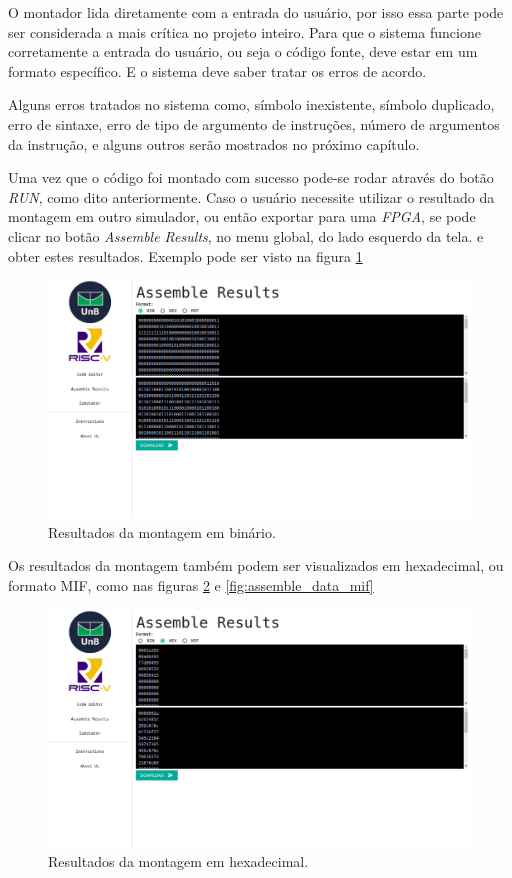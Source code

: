 	O montador lida diretamente com a entrada do usuário, por isso essa parte pode ser considerada a mais crítica no projeto inteiro. Para que o sistema funcione corretamente a entrada do usuário, ou seja o código fonte, deve estar em um formato específico. E o sistema deve saber tratar os erros de acordo. 

	Alguns erros tratados no sistema como, símbolo inexistente, símbolo duplicado, erro de sintaxe, erro de tipo de argumento de instruções, número de argumentos da instrução, e alguns outros serão mostrados no próximo capítulo.

	Uma vez que o código foi montado com sucesso pode-se rodar através do botão \textit{RUN}, como dito anteriormente. Caso o usuário necessite utilizar o resultado da montagem em outro simulador, ou então exportar para uma \textit{FPGA}, se pode clicar no botão \textit{Assemble Results}, no menu global, do lado esquerdo da tela. e obter estes resultados. Exemplo pode ser visto na figura \ref{fig:assemble_data_bin}

	\begin{figure}[h]
	  \includegraphics[width=\linewidth]{img/assemble_data_bin.png}
	  \caption{Resultados da montagem em binário.}
	  \label{fig:assemble_data_bin}
	\end{figure}

	Os resultados da montagem também podem ser visualizados em hexadecimal, ou formato MIF, como nas figuras \ref{fig:assemble_data_hex} e \ref{fig:assemble_data_mif}

	\begin{figure}[h]
	  \includegraphics[width=\linewidth]{img/assemble_data_hex.png}
	  \caption{Resultados da montagem em hexadecimal.}
	  \label{fig:assemble_data_hex}
	\end{figure}

